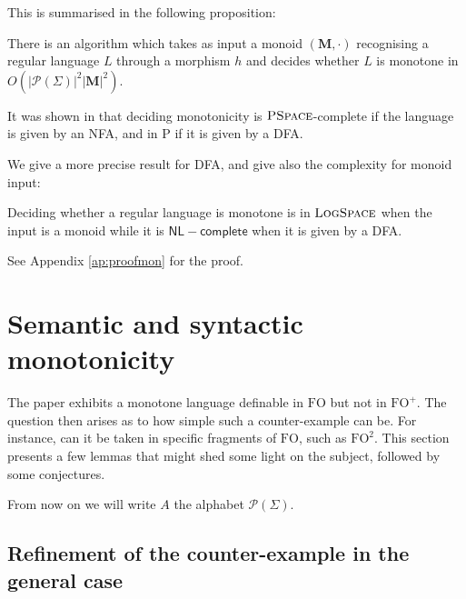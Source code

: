\documentclass[a4paper,UKenglish,cleveref, autoref, thm-restate]{lipics-v2021}
\renewcommand{\alph}{\part(\Sigma)}
\newcommand{\op}{\cdot}
\newcommand{\FO}{\mathrm{FO}}
\newcommand{\FOp}{\FO^+}
\newcommand{\FOtw}{\FO^2}
\renewcommand{\part}{\mathcal{P}}
\newcommand{\M}{\mathbf{M}}
\renewcommand{\L}{\textsc{LogSpace}}
\newcommand{\NL}{\mathsf{NL}}
\newcommand{\comp}{\mathsf{complete}}
\newcommand{\PSPACE}{\textsc{PSpace}}
\begin{document}
This is summarised in the following proposition:

\begin{proposition} \label{prop:algo}
    There is an algorithm which takes as input a monoid $(\M,\op)$ recognising a regular language $L$ through a morphism $h$ and decides whether $L$ is monotone in $O(|\alph|^2|\M|^2)$.
\end{proposition}


It was shown in \cite[Thm 2.5]{PFO} that deciding monotonicity is $\PSPACE$-complete if the language is given by an NFA, and in \textsc{P} if it is given by a DFA.

We give a more precise result for DFA, and give also the complexity for monoid input:

\begin{proposition}\label{complexity}
    Deciding whether a regular language is monotone is in $\L$ when the input is a monoid while it is $\NL-\comp$ when it is given by a DFA.
\end{proposition}

See Appendix \ref{ap:proofmon} for the proof.





\section{Semantic and syntactic monotonicity} \label{sec:semVSsynt}


The paper \cite[Definition 4.2]{PFO} exhibits a monotone language definable in $\FO$ but not in $\FOp$. The question then arises as to how simple such a counter-example can be. For instance, can it be taken in specific fragments of $\FO$, such as $\FOtw$. This section presents a few lemmas that might shed some light on the subject, followed by some conjectures.

From now on we will write $A$ the alphabet $\alph$.

















\subsection{Refinement of the counter-example in the general case} \label{sec:refinement}
\end{document}
